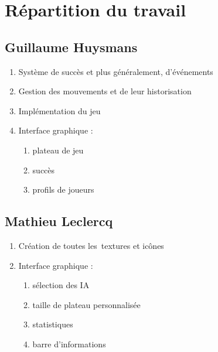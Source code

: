 \section{Répartition du travail}

\subsection{Guillaume Huysmans}
\begin{enumerate}
	\item Système de succès et plus généralement, d'événements
    \item Gestion des mouvements et de leur historisation
    \item Implémentation du jeu \oth
    \item Interface graphique :
    \begin{enumerate}
        \item plateau de jeu
        \item succès
        \item profils de joueurs
    \end{enumerate}
\end{enumerate}

\subsection{Mathieu Leclercq}
\begin{enumerate}
	\item Création de toutes les~textures et icônes
    \item Interface graphique : 
    \begin{enumerate}
        \item sélection des IA
        \item taille de plateau personnalisée
        \item statistiques
        \item barre d'informations
    \end{enumerate}
\end{enumerate}
